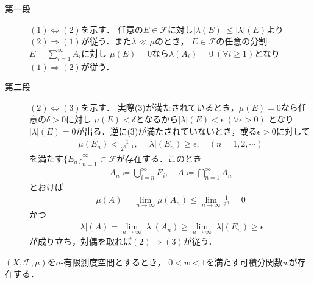 	\begin{prf}\mbox{}
		\begin{description}
			\item[第一段]
				$(1) \Longleftrightarrow (2)$を示す．
				任意の$E \in \mathscr{F}$に対し$|\lambda(E)| \leq |\lambda|(E)$より
				$(2) \Longrightarrow (1)$が従う．また$\lambda \ll \mu$のとき，
				$E \in \mathscr{F}$の任意の分割$E = \sum_{i=1}^\infty A_i$に対し
				$\mu(E) = 0$なら$\lambda(A_i) = 0\ (\forall i \geq 1)$となり
				$(1) \Longrightarrow (2)$が従う．
				
			\item[第二段]
				$(2) \Longleftrightarrow (3)$を示す．
				実際(3)が満たされているとき，$\mu(E) = 0$なら任意の$\delta > 0$に対し
				$\mu(E) < \delta$となるから$|\lambda|(E) < \epsilon\ (\forall \epsilon > 0)$
				となり$|\lambda|(E) = 0$が出る．逆に(3)が満たされていないとき，或る$\epsilon > 0$に対して
				\begin{align}
					\mu(E_n) < \frac{1}{2^{n+1}}, \quad |\lambda|(E_n) \geq \epsilon,
					\quad (n=1,2,\cdots)
				\end{align}
				を満たす$\{E_n\}_{n=1}^\infty \subset \mathscr{F}$が存在する．このとき
				\begin{align}
					A_n \coloneqq \bigcup_{i=n}^\infty E_i,
					\quad A \coloneqq \bigcap_{n=1}^\infty A_n
				\end{align}
				とおけば
				\begin{align}
					\mu(A) = \lim_{n \to \infty} \mu(A_n) 
					\leq \lim_{n \to \infty} \frac{1}{2^n} = 0
				\end{align}
				かつ
				\begin{align}
					|\lambda|(A) = \lim_{n \to \infty} |\lambda|(A_n) 
					\geq \lim_{n \to \infty} |\lambda|(E_n) \geq \epsilon 
				\end{align}
				が成り立ち，対偶を取れば$(2) \Longrightarrow (3)$が従う．
				\QED
		\end{description}
	\end{prf}
	
	\begin{screen}
		\begin{lem}\label{lem:Lebesgue_Radon_Nikodym}
			$(X,\mathscr{F},\mu)$を$\sigma$-有限測度空間とするとき，
			$0 < w < 1$を満たす可積分関数$w$が存在する．
		\end{lem}
	\end{screen}
	
